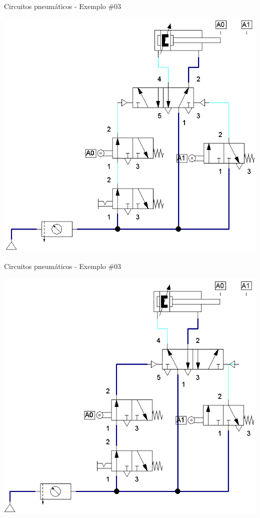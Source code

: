 \begin{frame}{Circuitos pneumáticos - Exemplo \#03}
	
	\centering
	\includegraphics[width=0.7\linewidth]{Figuras/Ch14/fig47n2}
	
\end{frame}


\begin{frame}{Circuitos pneumáticos - Exemplo \#03}
	
	\centering
	\includegraphics[width=0.7\linewidth]{Figuras/Ch14/fig47n3}
	
\end{frame}


